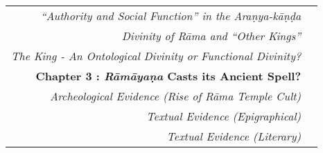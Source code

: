 {\begin{longtable}[r]{rr@{}}
{\sl “Authority and Social Function” in the Araṇya-kāṇḍa} & \pageref{sec2.3.1}\\
{\sl Divinity of Rāma and “Other Kings”} & \pageref{sec2.4}\\
{\sl The King - An Ontological Divinity or Functional Divinity?} & \pageref{sec2.5}\\[7pt]
{\hfill\bfseries Chapter 3 : {\sl\bfseries Rāmāyaṇa} Casts its Ancient Spell?} & \hfill\pageref{chapter3}\\
{\sl Archeological Evidence (Rise of Rāma Temple Cult)} & \pageref{sec3.1}\\
{\sl Textual Evidence (Epigraphical)} & \pageref{sec3.2}\\
{\sl Textual Evidence (Literary)} & \pageref{sec3.3}\\[7pt]
\end{longtable}}
